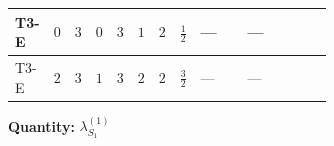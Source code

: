 \documentclass[8pt]{article}
\begin{document}
\begin{landscape}
\begin{longtable}{@{}llcccccc >{\raggedright\arraybackslash}p{0.21\linewidth} >{\raggedright\arraybackslash}p{0.21\linewidth} >{\raggedright\arraybackslash}p{0.21\linewidth}@{}}
\midrule
T3-E & $0$ & $3$ & $0$ & $3$ & $1$ & $2$ & $\frac{1}{2}$ & --- & --- & \scriptsize\adjustbox{max width=\linewidth}{$\begin{gathered} {\lambda_{S_1}^{(1)}} (4 T_{\nu}^{(1)}+14 {\lambda_{S_1}^{(A)}})\end{gathered}$} \\
\midrule
T3-E & $2$ & $3$ & $1$ & $3$ & $2$ & $2$ & $\frac{3}{2}$ & --- & --- & \scriptsize\adjustbox{max width=\linewidth}{$\begin{gathered} {\lambda_{S_1}^{(1)}} (4 T_{\nu}^{(1)}+14 {\lambda_{S_1}^{(A)}})\end{gathered}$} \\
\midrule
\bottomrule
\end{longtable}
\clearpage
\noindent\textbf{Quantity: }$\lambda_{S_1}^{(1)}$\par\smallskip

\end{landscape}
\end{document}
